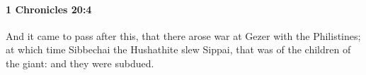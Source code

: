 
		\paragraph{1 Chronicles 20:4} %
			\label{1CHRONICLES-20-4}

			And it came to pass after this, that there arose war at Gezer with the Philistines; at which time Sibbechai the Hushathite slew Sippai, that was of the children of the giant: and they were subdued.


